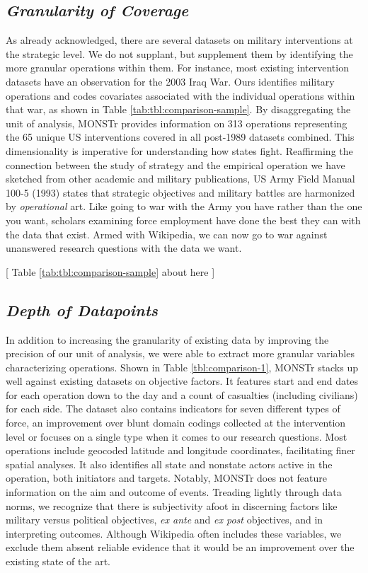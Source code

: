 \documentclass[fleqn,12pt]{article}
\begin{document}
\subsection*{\textit{Granularity of Coverage}}
As already acknowledged, there are several datasets on military interventions at the strategic level. We do not supplant, but supplement them by identifying the more granular operations within them. For instance, most existing intervention datasets have an observation for the 2003 Iraq War. Ours identifies military operations and codes covariates associated with the individual operations within that war, as shown in Table \ref{tab:tbl:comparison-sample}. By disaggregating the unit of analysis, MONSTr provides information on 313 operations representing the 65 unique US interventions covered in all post-1989 datasets combined. This dimensionality is imperative for understanding how states fight. Reaffirming the connection between the study of strategy and the empirical operation we have sketched from other academic and military publications, US Army Field Manual 100-5 (1993) states that strategic objectives and military battles are harmonized by \textit{operational} art. Like going to war with the Army you have rather than the one you want, scholars examining force employment have done the best they can with the data that exist. Armed with Wikipedia, we can now go to war against unanswered research questions with the data we want.

\begin{center}
	[ Table \ref{tab:tbl:comparison-sample} about here ]
\end{center}

\subsection*{\textit{Depth of Datapoints}}
In addition to increasing the granularity of existing data by improving the precision of our unit of analysis, we were able to extract more granular variables characterizing operations. Shown in Table \ref{tbl:comparison-1}, MONSTr stacks up well against existing datasets on objective factors. It features start and end dates for each operation down to the day and a count of casualties (including civilians) for each side. The dataset also contains indicators for seven different types of force, an improvement over blunt domain codings collected at the intervention level or focuses on a single type when it comes to our research questions. Most operations include geocoded latitude and longitude coordinates, facilitating finer spatial analyses. It also identifies all state and nonstate actors active in the operation, both initiators and targets. Notably, MONSTr does not feature information on the aim and outcome of events. Treading lightly through data norms, we recognize that there is subjectivity afoot in discerning factors like military versus political objectives, \textit{ex ante} and \textit{ex post} objectives, and in interpreting outcomes. Although Wikipedia often includes these variables, we exclude them absent reliable evidence that it would be an improvement over the existing state of the art.
\end{document}
